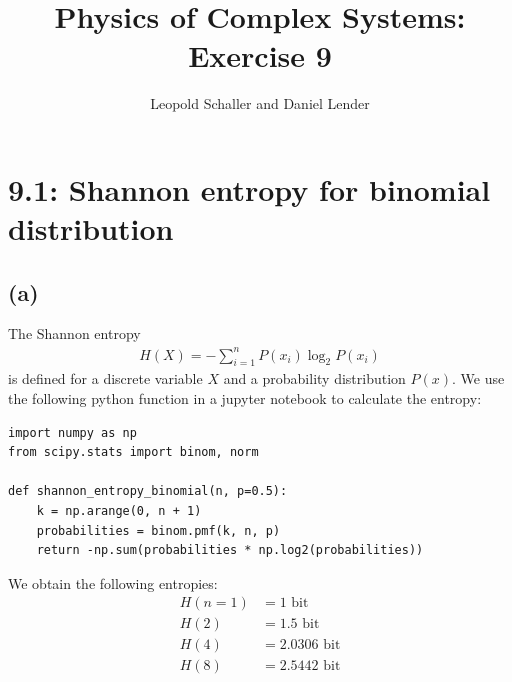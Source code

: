 \documentclass{article}
\title{Physics of Complex Systems: Exercise 9}
\author{Leopold Schaller and Daniel Lender}
\begin{document}
\maketitle

\section*{9.1: Shannon entropy for binomial distribution}
\subsection*{(a)}
The Shannon entropy
\begin{align}
H(X) = -\sum_{i=1}^{n} P(x_i) \log_2 P(x_i)
\end{align}
is defined for a discrete variable $X$ and a probability distribution $P(x)$.
We use the following python function in a jupyter notebook to calculate the entropy:
\begin{verbatim}
import numpy as np
from scipy.stats import binom, norm

def shannon_entropy_binomial(n, p=0.5):
    k = np.arange(0, n + 1)
    probabilities = binom.pmf(k, n, p)
    return -np.sum(probabilities * np.log2(probabilities))
\end{verbatim}

    We obtain the following entropies:
    \begin{align}
H (n=1) &= 1 \text{ bit} \\
H (2) &= 1.5 \text{ bit} \\
H (4) &= 2.0306 \text{ bit}  \\
H (8) &= 2.5442 \text{ bit}
    \end{align}
\end{document}
